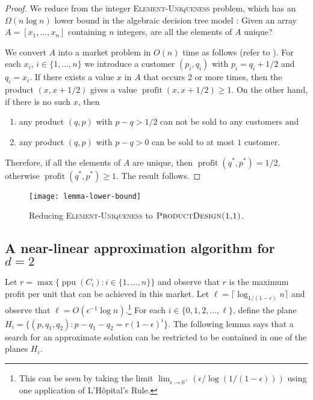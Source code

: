 \documentclass[lotsofwhite]{patmorin}
\newcommand{\ppu}{\operatorname{ppu}}
\newcommand{\val}{\operatorname{profit}}
\begin{document}
\begin{proof}
  We reduce from the integer \textsc{Element-Uniqueness} problem, which
  has an $\Omega(n\log n)$ lower bound in the algebraic decision tree
  model \cite{boYY,yXX}: Given an array $A=[x_1,\ldots,x_n]$ containing
  $n$ integers, are all the elements of $A$ unique?

  We convert $A$ into a market problem in $O(n)$ time as follows (refer
  to ).  For each $x_i$, $i\in\{1,\ldots,n\}$
  we introduce a customer $(p_i,q_i)$ with $p_i=q_i+1/2$ and $q_i=x_i$.
  If there exists a value $x$ in $A$ that occurs $2$ or more times, then
  the product $(x,x+1/2)$ gives a value $\val(x,x+1/2) \ge 1$.  On the
  other hand, if there is no such $x$, then \begin{enumerate} \item
  any product $(q,p)$ with $p-q>1/2$ can not be sold to any customers
  and \item any product $(q,p)$ with $p-q>0$ can be sold to at most $1$
  customer.  \end{enumerate} Therefore, if all the elements of $A$ are
  unique, then $\val(q^*,p^*) = 1/2$, otherwise $\val(q^*,p^*) \ge 1$.
  The result follows.
\end{proof}

\begin{figure}
  \begin{center}
    \texttt{[image: lemma-lower-bound]}
  \end{center}
  \caption{Reducing \textsc{Element-Uniqueness} to
           $\textsc{ProductDesign(1,1)}$.}
\end{figure}

\subsection{A near-linear approximation algorithm for $d=2$}

Let $r=\max\{\ppu(C_i) : i\in\{1,\ldots, n\}\}$ and observe that $r$
is the maximum profit per unit that can be achieved in this market.
Let $\ell = \lceil\log_{1/(1-\epsilon)} n\rceil$ and observe that $\ell =
O(\epsilon^{-1}\log n)$.\footnote{This can be seen by taking the limit
$\lim_{\epsilon\rightarrow 0^+} (\epsilon/\log(1/(1-\epsilon)))$ using one
application of L'H\^opital's Rule.} For each $i\in\{0,1,2,\ldots,\ell\}$,
define the plane $H_i = \{ (p,q_1,q_2) : p-q_1-q_2 = r(1-\epsilon)^i \}$.
The following lemma says that a search for an approximate solution can
be restricted to be contained in one of the planes $H_i$.
\end{document}
